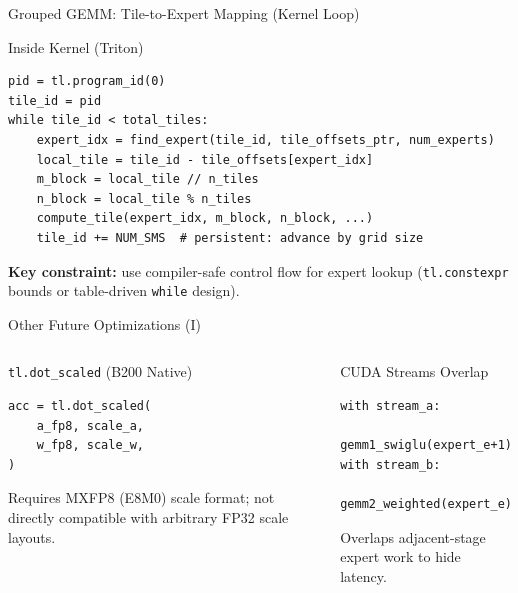 \documentclass[aspectratio=169,11pt]{beamer}
\begin{document}
\begin{frame}[fragile,t]{Grouped GEMM: Tile-to-Expert Mapping (Kernel Loop)}
\small
\begin{block}{Inside Kernel (Triton)}
\begin{lstlisting}[basicstyle=\ttfamily\scriptsize]
pid = tl.program_id(0)
tile_id = pid
while tile_id < total_tiles:
    expert_idx = find_expert(tile_id, tile_offsets_ptr, num_experts)
    local_tile = tile_id - tile_offsets[expert_idx]
    m_block = local_tile // n_tiles
    n_block = local_tile % n_tiles
    compute_tile(expert_idx, m_block, n_block, ...)
    tile_id += NUM_SMS  # persistent: advance by grid size
\end{lstlisting}
\end{block}

\textbf{Key constraint:} use compiler-safe control flow for expert lookup
(\texttt{tl.constexpr} bounds or table-driven \texttt{while} design).
\end{frame}

\begin{frame}[fragile,t]{Other Future Optimizations (I)}
\small
\begin{columns}[T]
\begin{block}{\texttt{tl.dot\_scaled} (B200 Native)}
\begin{lstlisting}[basicstyle=\ttfamily\scriptsize]
acc = tl.dot_scaled(
    a_fp8, scale_a,
    w_fp8, scale_w,
)
\end{lstlisting}
Requires MXFP8 (E8M0) scale format; not directly compatible with arbitrary FP32 scale layouts.
\end{block}

\begin{block}{CUDA Streams Overlap}
\begin{lstlisting}[basicstyle=\ttfamily\scriptsize]
with stream_a:
    gemm1_swiglu(expert_e+1)
with stream_b:
    gemm2_weighted(expert_e)
\end{lstlisting}
Overlaps adjacent-stage expert work to hide latency.
\end{block}
\end{columns}
\end{frame}
\end{document}
